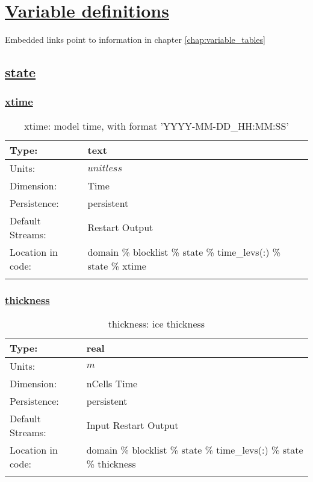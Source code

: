 \chapter[Variable definitions]{\hyperref[chap:variable_tables]{Variable definitions}}
\label{chap:variable_sections}
Embedded links point to information in chapter \ref{chap:variable_tables}
\section[state]{\hyperref[sec:var_tab_state]{state}}
\label{sec:var_sec_state}
\subsection[xtime]{\hyperref[sec:var_tab_state]{xtime}}
\label{subsec:var_sec_state_xtime}
\begin{center}
\begin{longtable}{| p{2.0in} | p{4.0in} |}
        \hline 
        Type: & text \\
        \hline 
        Units: & $unitless$ \\
        \hline 
        Dimension: & Time \\
        \hline 
        Persistence: & persistent \\
        \hline 
		 Default Streams: & Restart Output  \\
        \hline 
		 Location in code: & domain \% blocklist \% state \% time\_levs(:) \% state \% xtime \\
		 \hline 
    \caption{xtime: model time, with format 'YYYY-MM-DD\_HH:MM:SS'}
\end{longtable}
\end{center}
\subsection[thickness]{\hyperref[sec:var_tab_state]{thickness}}
\label{subsec:var_sec_state_thickness}
\begin{center}
\begin{longtable}{| p{2.0in} | p{4.0in} |}
        \hline 
        Type: & real \\
        \hline 
        Units: & $m$ \\
        \hline 
        Dimension: & nCells Time \\
        \hline 
        Persistence: & persistent \\
        \hline 
		 Default Streams: & Input Restart Output  \\
        \hline 
		 Location in code: & domain \% blocklist \% state \% time\_levs(:) \% state \% thickness \\
		 \hline 
    \caption{thickness: ice thickness}
\end{longtable}
\end{center}
